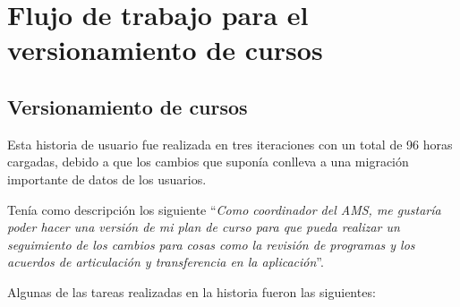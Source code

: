 \section{Flujo de trabajo para el versionamiento de cursos}
\begin{table}[H]
\centering
\caption{Historias de usuario para el flujo de trabajo para el versionamiento de cursos}
\label{epic:6}
\end{table}


\subsection{Versionamiento de cursos}
Esta historia de usuario fue realizada en tres iteraciones con un total de 96 horas cargadas, debido a que los cambios que suponía conlleva a una migración importante de datos de los usuarios.

Tenía como descripción los siguiente \enquote{\textit{Como coordinador del AMS, me gustaría poder hacer una versión de mi plan de curso para que pueda realizar un seguimiento de los cambios para cosas como la revisión de programas y los acuerdos de articulación y transferencia en la aplicación}}.

Algunas de las tareas realizadas en la historia fueron las siguientes:

